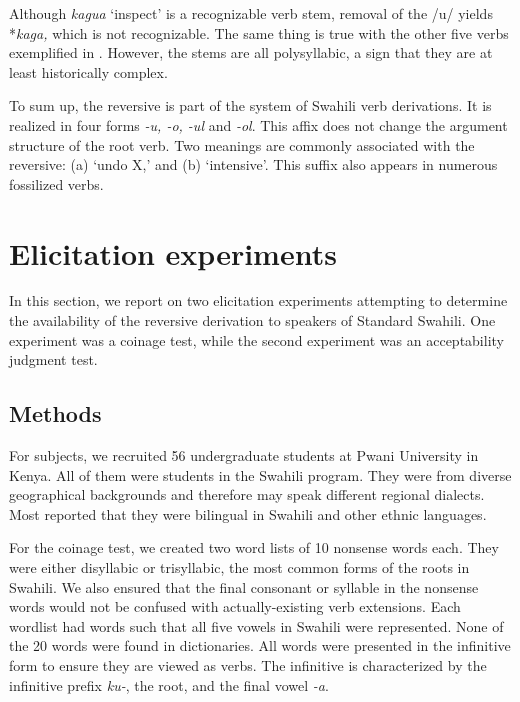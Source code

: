 \documentclass[output=paper]{langsci/langscibook}
\begin{document}
Although \textit{kagua} ‘inspect’ is a recognizable verb stem, removal of the /u/ yields *\textit{kaga,} which is not recognizable. The same thing is true with the other five verbs exemplified in . However, the stems are all polysyllabic, a sign that they are at least historically complex.

To sum up, the reversive is part of the system of Swahili verb derivations. It is realized in four forms \textit{{}-u, -o, -ul} and \textit{{}-ol}. This affix does not change the argument structure of the root verb. Two meanings are commonly associated with the reversive: (a) ‘undo X,’ and (b) ‘intensive’. This suffix also appears in numerous fossilized verbs.

\section{Elicitation experiments}\label{sec:ngonyaningowa:4}

In this section, we report on two elicitation experiments attempting to determine the availability of the reversive derivation to speakers of Standard Swahili. One experiment was a coinage test, while the second experiment was an acceptability judgment test. 

\subsection{Methods}\label{sec:ngonyaningowa:4.1}

For subjects, we recruited 56 undergraduate students at Pwani University in Kenya. All of them were students in the Swahili program. They were from diverse geographical backgrounds and therefore may speak different regional dialects. Most reported that they were bilingual in Swahili and other ethnic languages. 

For the coinage test, we created two word lists of 10 nonsense words each. They were either disyllabic or trisyllabic, the most common forms of the roots in Swahili. We also ensured that the final consonant or syllable in the nonsense words would not be confused with actually-existing verb extensions. Each wordlist had words such that all five vowels in Swahili were represented.  None of the 20 words were found in dictionaries. All words were presented in the infinitive form to ensure they are viewed as verbs. The infinitive is characterized by the infinitive prefix \textit{ku-}, the root, and the final vowel \textit{{}-a}.
\end{document}

